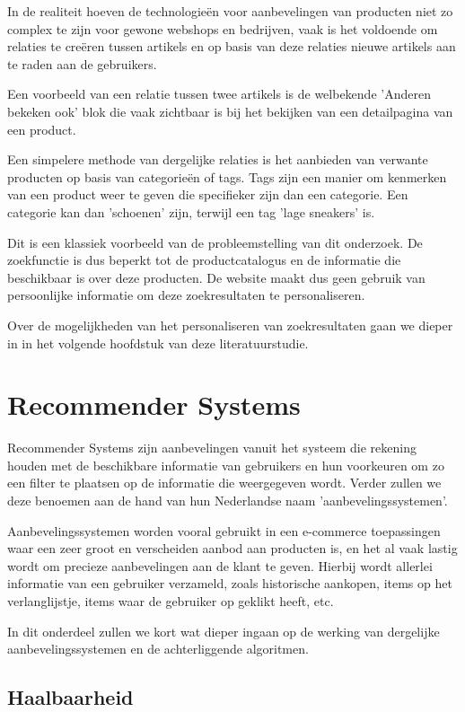 In de realiteit hoeven de technologieën voor aanbevelingen van producten niet zo complex te zijn voor gewone webshops en bedrijven, vaak is het voldoende om relaties te creëren tussen artikels en op basis van deze relaties nieuwe artikels aan te raden aan de gebruikers. 

Een voorbeeld van een relatie tussen twee artikels is de welbekende 'Anderen bekeken ook' blok die vaak zichtbaar is bij het bekijken van een detailpagina van een product. 

Een simpelere methode van dergelijke relaties is het aanbieden van verwante producten op basis van categorieën of tags. Tags zijn een manier om kenmerken van een product weer te geven die specifieker zijn dan een categorie. Een categorie kan dan 'schoenen' zijn, terwijl een tag 'lage sneakers' is. 

Dit is een klassiek voorbeeld van de probleemstelling van dit onderzoek. De zoekfunctie is dus beperkt tot de productcatalogus en de informatie die beschikbaar is over deze producten. De website maakt dus geen gebruik van persoonlijke informatie om deze zoekresultaten te personaliseren.

Over de mogelijkheden van het personaliseren van zoekresultaten gaan we dieper in in het volgende hoofdstuk van deze literatuurstudie.

\section{Recommender Systems}
\label{sec:Recommender Systems}
Recommender Systems \autocite{Resnick1997} zijn aanbevelingen vanuit het systeem die rekening houden met de beschikbare informatie van gebruikers en hun voorkeuren om zo een filter te plaatsen op de informatie die weergegeven wordt. Verder zullen we deze benoemen aan de hand  van hun Nederlandse naam 'aanbevelingssystemen'.

Aanbevelingssystemen worden vooral gebruikt in een e-commerce toepassingen waar een zeer groot en verscheiden aanbod aan producten is, en het al vaak lastig wordt om precieze aanbevelingen aan de klant te geven. Hierbij wordt allerlei informatie van een gebruiker verzameld, zoals historische aankopen, items op het verlanglijstje, items waar de gebruiker op geklikt heeft, etc.

In dit onderdeel zullen we kort wat dieper ingaan op de werking van dergelijke aanbevelingssystemen en de achterliggende algoritmen.

\subsection{Haalbaarheid}
\label{sec:Haalbaarheid}

